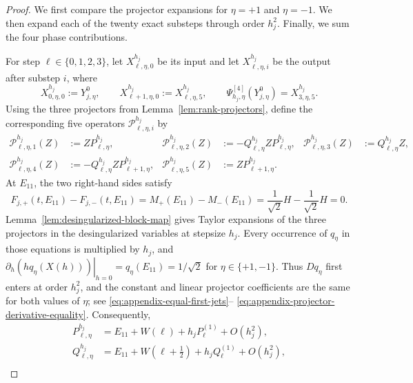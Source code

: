 \documentclass[10pt,a4paper]{amsart}
\numberwithin{equation}{section}
\begin{document}
\begin{proof}
We first compare the projector expansions for $\eta=+1$ and $\eta=-1$.
We then expand each of the twenty exact substeps through order $h_j^2$.
Finally, we sum the four phase contributions.

For step $\ell\in\{0,1,2,3\}$, let
$X^{h_j}_{\ell,\eta,0}$ be its input and let
$X^{h_j}_{\ell,\eta,i}$ be the output after substep $i$, where
\begin{equation}\label{eq:twenty-state-chain}
 X^{h_j}_{0,\eta,0}:=Y_{j,\eta}^0,
 \qquad X^{h_j}_{\ell+1,\eta,0}:=X^{h_j}_{\ell,\eta,5},
 \qquad
 \Psi^{[4]}_{h_j,\eta}(Y_{j,\eta}^0)=X^{h_j}_{3,\eta,5}.
\end{equation}
Using the three projectors from Lemma~\ref{lem:rank-projectors}, define
the corresponding five operators $\mathcal P^{h_j}_{\ell,\eta,i}$ by
\begin{equation}\label{eq:actual-five-actions}
\begin{aligned}
 \mathcal P^{h_j}_{\ell,\eta,1}(Z)&:=ZP^{h_j}_{\ell,\eta},
 &\mathcal P^{h_j}_{\ell,\eta,2}(Z)&:=-Q^{h_j}_{\ell,\eta}ZP^{h_j}_{\ell,\eta},
 &\mathcal P^{h_j}_{\ell,\eta,3}(Z)&:=Q^{h_j}_{\ell,\eta}Z,\\
 \mathcal P^{h_j}_{\ell,\eta,4}(Z)&:=-Q^{h_j}_{\ell,\eta}ZP^{h_j}_{\ell+1,\eta},
 &\mathcal P^{h_j}_{\ell,\eta,5}(Z)&:=ZP^{h_j}_{\ell+1,\eta}.
\end{aligned}
\end{equation}
At $E_{11}$, the two right-hand sides satisfy
\begin{equation}\label{eq:base-field-difference}
 F_{j,+}(t,E_{11})-F_{j,-}(t,E_{11})
 =M_+(E_{11})-M_-(E_{11})
 =\frac1{\sqrt2}H-\frac1{\sqrt2}H=0.
\end{equation}
Lemma~\ref{lem:desingularized-block-map} gives Taylor expansions of the
three projectors in the desingularized variables at stepsize $h_j$.
Every occurrence of $q_\eta$ in those equations is multiplied by $h_j$,
and
$\left.\partial_h(hq_\eta(X(h)))\right|_{h=0}
=q_\eta(E_{11})=1/\sqrt2$ for $\eta\in\{+1,-1\}$.
Thus $Dq_\eta$ first enters at order $h_j^2$, and the constant and linear
projector coefficients are the same for both values of $\eta$; see
\eqref{eq:appendix-equal-first-jets}--
\eqref{eq:appendix-projector-derivative-equality}.  Consequently,
\begin{align*}
 P^{h_j}_{\ell,\eta}
 &=E_{11}+W(\ell)+h_jP^{(1)}_{\ell}+O(h_j^2),\\
 Q^{h_j}_{\ell,\eta}
 &=E_{11}+W(\ell+\tfrac12)+h_jQ^{(1)}_{\ell}+O(h_j^2),\\

\end{align*}
\end{proof}
\end{document}
